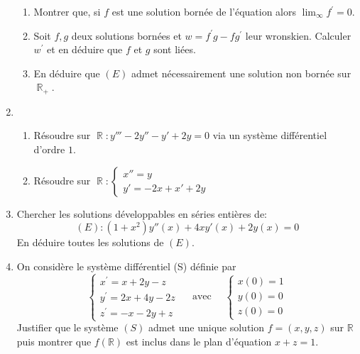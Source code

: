 \documentclass[12pt,a4paper]{article}
\DeclareMathOperator{\R}{\mathbb{R}}
\begin{document}
\begin{enumerate}
\begin{enumerate}
	\item Montrer que, si $f$ est une solution born\'{e}e de l'\'{e}quation alors $\lim_{\infty }f^{\prime }=0$.
	\item Soit $f,g$ deux solutions born\'{e}es et $w=f^{\prime }g-fg^{\prime }$
	leur wronskien. Calculer $w^{\prime }$ et en d\'{e}duire que $f$ et $g$ sont
	li\'{e}es.
	\item En déduire que $(E)$ admet nécessairement une solution non bornée sur $\R_+$.
\end{enumerate}

\item 
\begin{enumerate}
	\item
	Résoudre sur $\R:y'''-2y''-y'+2y=0$ via un système différentiel d'ordre $1$.
	\item Résoudre sur $\R:\begin{cases}
		x''=y\\y'=-2x+x'+2y
	\end{cases}$
\end{enumerate}

\item 	Chercher les solutions développables en séries entières de:
$$(E):(1+x^2)y''(x)+4xy'(x)+2y(x)=0$$ En déduire toutes les solutions de $(E)$.

\item
On considère le système différentiel (S) définie par
$$
\left\{\begin{array}{l}
	x^{\prime}=x+2 y-z \\
	y^{\prime}=2 x+4 y-2 z \\
	z^{\prime}=-x-2 y+z
\end{array} \quad\right. \text { avec } \quad\left\{\begin{array}{l}
	x(0)=1 \\
	y(0)=0 \\
	z(0)=0
\end{array}\right.
$$
Justifier que le système $(S)$ admet une unique solution $f=(x, y, z)$ sur $\mathbb{R}$ puis montrer que $f(\mathbb{R})$ est inclus dans le plan d'équation $x+z=1$.


\end{enumerate}
\end{document}
